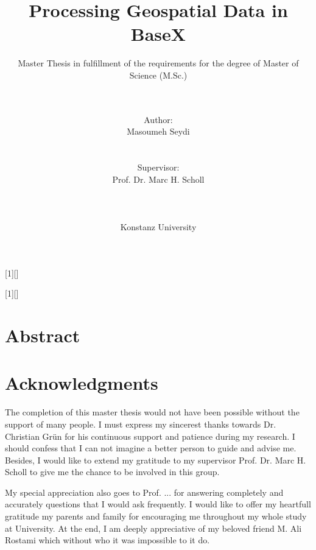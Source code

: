 \documentclass[a4paper,12pt]{article}
\title{Processing Geospatial Data in BaseX}
\subtitle{Master Thesis in fulfillment of the requirements for the degree of
Master of Science (M.Sc.)}
\author{\\\\Author: \\
	Masoumeh Seydi
	\\\\\\Supervisor: \\
	Prof. Dr. Marc H. Scholl \\ 
	\\\\\\
	Konstanz University}
\begin{document}
[1][]{
\lstset{#1}}{}

[1][]{
\lstset{#1}}{}


\renewcommand{\lstlistingname}{Code}


\maketitle
\thispagestyle{empty}

\newpage
\section*{Abstract}

\thispagestyle{empty}

\newpage
\section*{Acknowledgments}
\thispagestyle{empty}

The completion of this master thesis would not have been possible 
without the support of many people. 
I must express my sincerest thanks towards 
Dr. Christian Gr{\"u}n for his continuous support and patience during my research.
I should confess that I can not imagine a better person to guide and advise me. Besides, I would like to extend my gratitude to my supervisor Prof. Dr. Marc H. Scholl to give me the chance to be involved in this group.

My special appreciation also goes to Prof. ...  for
answering completely and accurately questions that I would ask
frequently. I would like to offer my heartfull gratitude my parents and family for encouraging me 
throughout my whole study at University. At the end, I am deeply appreciative of my beloved friend M. Ali Rostami which without who it was impossible to it do.
\end{document}
